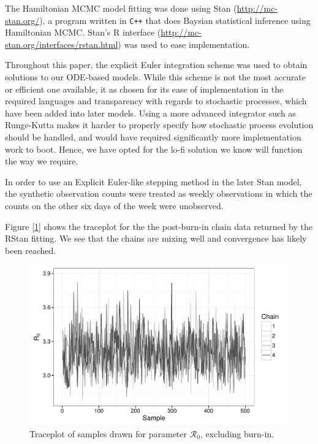    The Hamiltonian MCMC model fitting was done using Stan (\url{http://mc-stan.org/}), a program written in \verb|C++| that does Baysian statistical inference using Hamiltonian MCMC. Stan's R interface (\url{http://mc-stan.org/interfaces/rstan.html}) was used to ease implementation.

    Throughout this paper, the explicit Euler integration scheme was used to obtain solutions to our ODE-based models. While this scheme is not the most accurate or efficient one available, it as chosen for its ease of implementation in the required languages and transparency with regards to stochastic processes, which have been added into later models. Using a more advanced integrator such as Runge-Kutta makes it harder to properly specify how stochastic process evolution should be handled, and would have required significantly more implementation work to boot. Hence, we have opted for the lo-fi solution we know will function the way we require.

    In order to use an Explicit Euler-like stepping method in the later Stan model, the synthetic observation counts were treated as weekly observations in which the counts on the other six days of the week were unobserved.

    Figure [\ref{traceplot}] shows the traceplot for the the post-burn-in chain data returned by the RStan fitting. We see that the chains are mixing well and convergence has likely been reached.

    \begin{figure}
        \centering
        \captionsetup{width=0.8\linewidth}
        \includegraphics[width=\textwidth]{./images/traceplotR0.pdf}
        \caption{Traceplot of samples drawn for parameter $\mathcal{R}_0$, excluding burn-in. \label{traceplot}}
    \end{figure}

